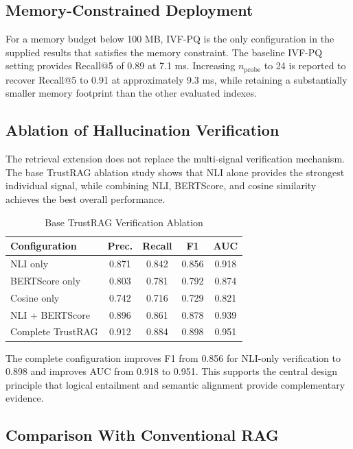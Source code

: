 \documentclass[conference]{IEEEtran}
\begin{document}
\subsection{Memory-Constrained Deployment}

For a memory budget below 100 MB, IVF-PQ is the only configuration in the supplied results that satisfies the memory constraint. The baseline IVF-PQ setting provides Recall@5 of 0.89 at 7.1 ms. Increasing $n_{\mathrm{probe}}$ to 24 is reported to recover Recall@5 to 0.91 at approximately 9.3 ms, while retaining a substantially smaller memory footprint than the other evaluated indexes.

\subsection{Ablation of Hallucination Verification}

The retrieval extension does not replace the multi-signal verification mechanism. The base TrustRAG ablation study shows that NLI alone provides the strongest individual signal, while combining NLI, BERTScore, and cosine similarity achieves the best overall performance.

\begin{table}[t]
\caption{Base TrustRAG Verification Ablation}
\label{tab:ablation}
\centering
\small
\begin{tabular}{@{}lcccc@{}}
\toprule
Configuration & Prec. & Recall & F1 & AUC\\
\midrule
NLI only & 0.871 & 0.842 & 0.856 & 0.918\\
BERTScore only & 0.803 & 0.781 & 0.792 & 0.874\\
Cosine only & 0.742 & 0.716 & 0.729 & 0.821\\
NLI + BERTScore & 0.896 & 0.861 & 0.878 & 0.939\\
Complete TrustRAG & 0.912 & 0.884 & 0.898 & 0.951\\
\bottomrule
\end{tabular}
\end{table}

The complete configuration improves F1 from 0.856 for NLI-only verification to 0.898 and improves AUC from 0.918 to 0.951. This supports the central design principle that logical entailment and semantic alignment provide complementary evidence.

\subsection{Comparison With Conventional RAG}
\end{document}
